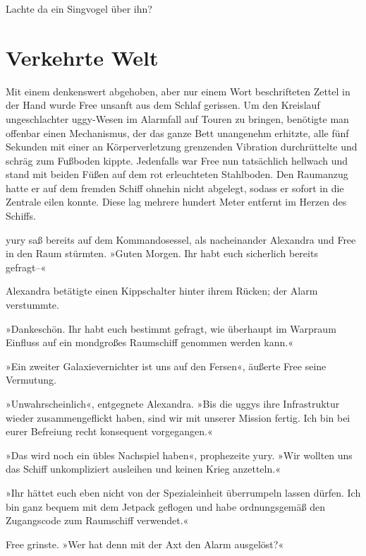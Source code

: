 Lachte da ein Singvogel über ihn?


\chapter{Verkehrte Welt}

Mit einem denkenswert abgehoben, aber nur einem Wort beschrifteten Zettel in der Hand wurde Free unsanft aus dem Schlaf gerissen. Um den Kreislauf ungeschlachter uggy-Wesen im Alarmfall auf Touren zu bringen, benötigte man offenbar einen Mechanismus, der das ganze Bett unangenehm erhitzte, alle fünf Sekunden mit einer an Körperverletzung grenzenden Vibration durchrüttelte und schräg zum Fußboden kippte. Jedenfalls war Free nun tatsächlich hellwach und stand mit beiden Füßen auf dem rot erleuchteten Stahlboden. Den Raumanzug hatte er auf dem fremden Schiff ohnehin nicht abgelegt, sodass er sofort in die Zentrale eilen konnte. Diese lag mehrere hundert Meter entfernt im Herzen des Schiffs.


yury saß bereits auf dem Kommandosessel, als nacheinander Alexandra und Free in den Raum stürmten. »Guten Morgen. Ihr habt euch sicherlich bereits gefragt–«

 Alexandra betätigte einen Kippschalter hinter ihrem Rücken; der Alarm verstummte.

»Dankeschön. Ihr habt euch bestimmt gefragt, wie überhaupt im Warpraum Einfluss auf ein mondgroßes Raumschiff genommen werden kann.«

»Ein zweiter Galaxievernichter ist uns auf den Fersen«, äußerte Free seine Vermutung.

»Unwahrscheinlich«, entgegnete Alexandra. »Bis die uggys ihre Infrastruktur wieder zusammengeflickt haben, sind wir mit unserer Mission fertig. Ich bin bei eurer Befreiung recht konsequent vorgegangen.«

»Das wird noch ein übles Nachspiel haben«, prophezeite yury. »Wir wollten uns das Schiff unkompliziert ausleihen und keinen Krieg anzetteln.«

»Ihr hättet euch eben nicht von der Spezialeinheit überrumpeln lassen dürfen. Ich bin ganz bequem mit dem Jetpack geflogen und habe ordnungsgemäß den Zugangscode zum Raumschiff verwendet.«

Free grinste. »Wer hat denn mit der Axt den Alarm ausgelöst?«

